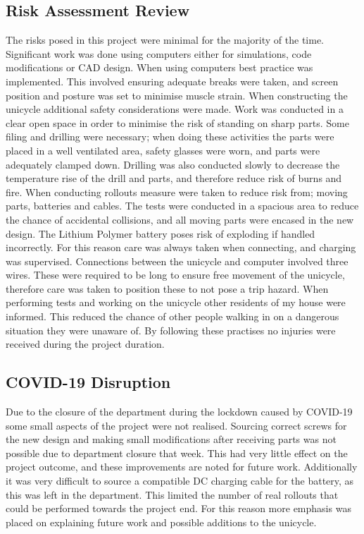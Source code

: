 \documentclass[twoside,twocolumn,12pt]{article}
\begin{document}
\subsection{Risk Assessment Review}
The risks posed in this project were minimal for the majority of the time. Significant work was done using computers either for simulations, code modifications or CAD design. When using computers best practice was implemented. This involved ensuring adequate breaks were taken, and screen position and posture was set to minimise muscle strain.
\newline
When constructing the unicycle additional safety considerations were made. Work was conducted in a clear open space in order to minimise the risk of standing on sharp parts. Some filing and drilling were necessary; when doing these activities the parts were placed in a well ventilated area, safety glasses were worn, and parts were adequately clamped down. Drilling was also conducted slowly to decrease the temperature rise of the drill and parts, and therefore reduce risk of burns and fire.
\newline
When conducting rollouts measure were taken to reduce risk from; moving parts, batteries and cables. The tests were conducted in a spacious area to reduce the chance of accidental collisions, and all moving parts were encased in the new design. The Lithium Polymer battery poses risk of exploding if handled incorrectly. For this reason care was always taken when connecting, and charging was supervised. Connections between the unicycle and computer involved three wires. These were required to be long to ensure free movement of the unicycle, therefore care was taken to position these to not pose a trip hazard.
\newline
When performing tests and working on the unicycle other residents of my house were informed. This reduced the chance of other people walking in on a dangerous situation they were unaware of.
\newline
By following these practises no injuries were received during the project duration.

\clearpage
\subsection{COVID-19 Disruption}
Due to the closure of the department during the lockdown caused by COVID-19 some small aspects of the project were not realised. 
\newline
Sourcing correct screws for the new design and making small modifications after receiving parts was not possible due to department closure that week. This had very little effect on the project outcome, and these improvements are noted for future work.
\newline
Additionally it was very difficult to source a compatible DC charging cable for the battery, as this was left in the department. This limited the number of real rollouts that could be performed towards the project end. For this reason more emphasis was placed on explaining future work and possible additions to the unicycle.



\end{document}
